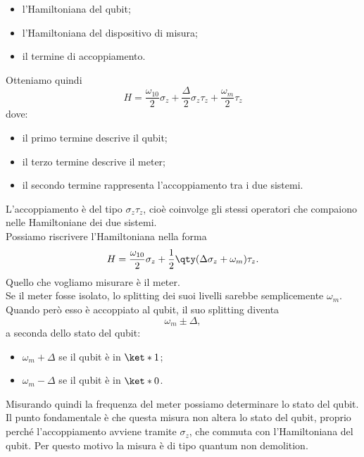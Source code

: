 \begin{itemize}[leftmargin=0.5cm]
    \item l'Hamiltoniana del qubit;
    \item l'Hamiltoniana del dispositivo di misura;
    \item il termine di accoppiamento.
\end{itemize}
Otteniamo quindi
\begin{equation*}
    H
    =
    \frac{\omega_{10}}{2}\sigma_z
    +
    \frac{\Delta}{2}\sigma_z\tau_z
    +
    \frac{\omega_m}{2}\tau_z
\end{equation*}
dove:
\begin{itemize}[leftmargin=0.5cm]
    \item il primo termine descrive il qubit;
    \item il terzo termine descrive il meter;
    \item il secondo termine rappresenta l'accoppiamento tra i due sistemi.
\end{itemize}
L'accoppiamento è del tipo $\sigma_z\tau_z$, cioè coinvolge gli stessi operatori che compaiono nelle Hamiltoniane dei due sistemi.\\
Possiamo riscrivere l'Hamiltoniana nella forma
\begin{equation*}
    H
    =
    \frac{\omega_{10}}{2}\sigma_z
    +
    \frac{1}{2}
    \qty(
        \Delta\sigma_z
        +
        \omega_m
    )\tau_z.
\end{equation*}
Quello che vogliamo misurare è il meter.\\
Se il meter fosse isolato, lo splitting dei suoi livelli sarebbe semplicemente $\omega_m$. Quando però esso è accoppiato al qubit, il suo splitting diventa
\[
\omega_m \pm \Delta,
\]
a seconda dello stato del qubit:
\begin{itemize}[leftmargin=0.5cm]
    \item $\omega_m+\Delta$ se il qubit è in $\ket*{1}$;
    \item $\omega_m-\Delta$ se il qubit è in $\ket*{0}$.
\end{itemize}
Misurando quindi la frequenza del meter possiamo determinare lo stato del qubit.\\
Il punto fondamentale è che questa misura non altera lo stato del qubit, proprio perché l'accoppiamento avviene tramite $\sigma_z$, che commuta con l'Hamiltoniana del qubit. Per questo motivo la misura è di tipo quantum non demolition.\\
